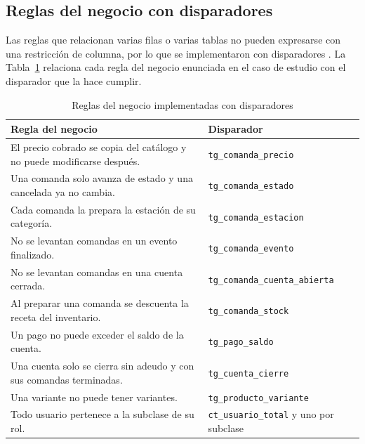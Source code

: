 \subsection{Reglas del negocio con disparadores}

Las reglas que relacionan varias filas o varias tablas no pueden expresarse con una restricción de columna, por lo que se implementaron con disparadores \parencite{postgres_triggers}. La Tabla~\ref{tab:disparadores} relaciona cada regla del negocio enunciada en el caso de estudio con el disparador que la hace cumplir.

\begin{table}[H]
    \centering
    \small
    \begin{tabularx}{\textwidth}
        {
            >{\RaggedRight\arraybackslash}X
            >{\RaggedRight\arraybackslash}p{5cm}
        }
        \toprule
        \textbf{Regla del negocio} & \textbf{Disparador} \\
        \midrule
        El precio cobrado se copia del catálogo y no puede modificarse después. & \texttt{tg\_comanda\_precio} \\
        Una comanda solo avanza de estado y una cancelada ya no cambia. & \texttt{tg\_comanda\_estado} \\
        Cada comanda la prepara la estación de su categoría. & \texttt{tg\_comanda\_estacion} \\
        No se levantan comandas en un evento finalizado. & \texttt{tg\_comanda\_evento} \\
        No se levantan comandas en una cuenta cerrada. & \texttt{tg\_comanda\_cuenta\_abierta} \\
        Al preparar una comanda se descuenta la receta del inventario. & \texttt{tg\_comanda\_stock} \\
        Un pago no puede exceder el saldo de la cuenta. & \texttt{tg\_pago\_saldo} \\
        Una cuenta solo se cierra sin adeudo y con sus comandas terminadas. & \texttt{tg\_cuenta\_cierre} \\
        Una variante no puede tener variantes. & \texttt{tg\_producto\_variante} \\
        Todo usuario pertenece a la subclase de su rol. & \texttt{ct\_usuario\_total} y uno por subclase \\
        \bottomrule
    \end{tabularx}
    \captionsetup{labelfont=bf, textfont=it, labelsep=newline, justification=raggedright, singlelinecheck=false}
    \caption{Reglas del negocio implementadas con disparadores}
    \label{tab:disparadores}
\end{table}

